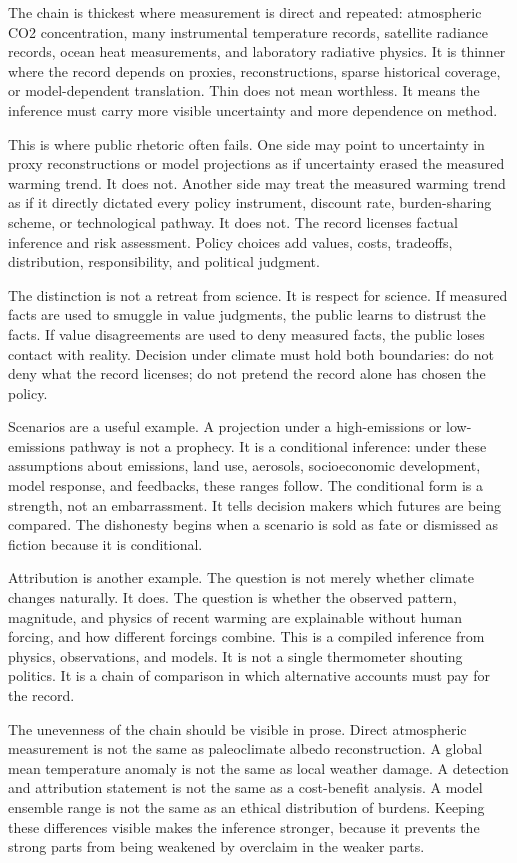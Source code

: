 The chain is thickest where measurement is direct and repeated: atmospheric
CO2 concentration, many instrumental temperature records, satellite radiance
records, ocean heat measurements, and laboratory radiative physics. It is
thinner where the record depends on proxies, reconstructions, sparse
historical coverage, or model-dependent translation. Thin does not mean
worthless. It means the inference must carry more visible uncertainty and
more dependence on method.

This is where public rhetoric often fails. One side may point to uncertainty
in proxy reconstructions or model projections as if uncertainty erased the
measured warming trend. It does not. Another side may treat the measured
warming trend as if it directly dictated every policy instrument, discount
rate, burden-sharing scheme, or technological pathway. It does not. The
record licenses factual inference and risk assessment. Policy choices add
values, costs, tradeoffs, distribution, responsibility, and political
judgment.

The distinction is not a retreat from science. It is respect for science. If
measured facts are used to smuggle in value judgments, the public learns to
distrust the facts. If value disagreements are used to deny measured facts,
the public loses contact with reality. Decision under climate must hold both
boundaries: do not deny what the record licenses; do not pretend the record
alone has chosen the policy.

Scenarios are a useful example. A projection under a high-emissions or
low-emissions pathway is not a prophecy. It is a conditional inference:
under these assumptions about emissions, land use, aerosols, socioeconomic
development, model response, and feedbacks, these ranges follow. The
conditional form is a strength, not an embarrassment. It tells decision makers
which futures are being compared. The dishonesty begins when a scenario is
sold as fate or dismissed as fiction because it is conditional.

Attribution is another example. The question is not merely whether climate
changes naturally. It does. The question is whether the observed pattern,
magnitude, and physics of recent warming are explainable without human
forcing, and how different forcings combine. This is a compiled inference
from physics, observations, and models. It is not a single thermometer
shouting politics. It is a chain of comparison in which alternative accounts
must pay for the record.

The unevenness of the chain should be visible in prose. Direct atmospheric
measurement is not the same as paleoclimate albedo reconstruction. A global
mean temperature anomaly is not the same as local weather damage. A detection
and attribution statement is not the same as a cost-benefit analysis. A model
ensemble range is not the same as an ethical distribution of burdens. Keeping
these differences visible makes the inference stronger, because it prevents
the strong parts from being weakened by overclaim in the weaker parts.

